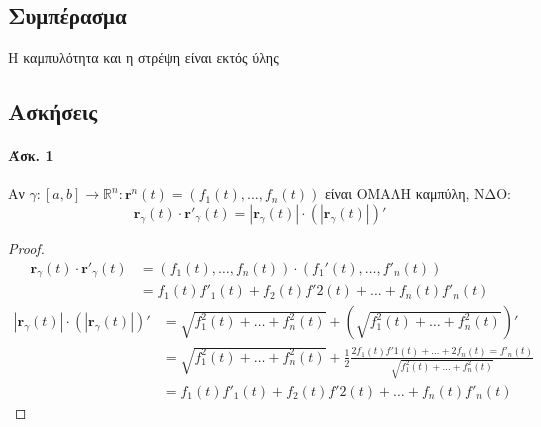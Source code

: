 \documentclass[11pt,a4paper,titlepage,draft]{article}
\begin{document}
\subsection{Συμπέρασμα}
\begin{attnbox}{}
Η καμπυλότητα και η στρέψη είναι εκτός ύλης
\end{attnbox}

\subsection{Ασκήσεις}
\paragraph{Άσκ. 1}
Αν \(\gamma:[a,b] \to  \mathbb R ^n: \mathbf r^n (t)
= \left( f_1(t),\dots,f_n(t) \right) \) είναι ΟΜΑΛΗ καμπύλη, ΝΔΟ:
\[
\mathbf r_\gamma (t) \cdot \mathbf r' _\gamma(t) = |\mathbf r _\gamma (t)| \cdot
\left( |\mathbf r_\gamma(t)| \right)'
\]
\begin{proof}
\begin{align*}
 \mathbf r_\gamma(t) \cdot   \mathbf r'_\gamma(t)
 &= \left( f_1(t),\dots ,f_n(t) \right) \cdot \left( f_1'(t),\dots,f'_n(t) \right) \\
&= f_1(t)f'_1(t)+f_2(t)f'2(t)+\dots+f_n(t)f'_n(t)
\end{align*}
\begin{align*}
 |\mathbf r _\gamma (t)| \cdot \left( |\mathbf r_\gamma(t)| \right)'
 &= \sqrt{f_1^2(t) + \dots + f_n^2(t)} + \left( \sqrt{f_1^2(t) + \dots + f_n^2(t)} \right)' \\
 &= \sqrt{f_1^2(t) + \dots + f_n^2(t)} + \frac{1}{2} \frac{2f_1(t)f'1(t)+\dots+2f_n(t)=f'_n(t)}{\sqrt{f_1^2(t) + \dots + f_n^2(t)}} \\
 &= f_1(t)f'_1(t)+f_2(t)f'2(t)+\dots+f_n(t)f'_n(t)
\end{align*}
\end{proof}
\end{document}
